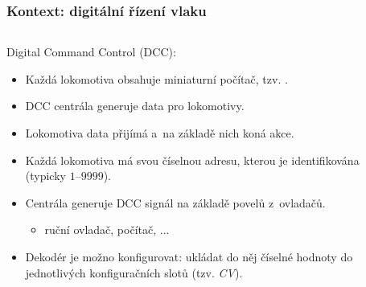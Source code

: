 \documentclass[aspectratio=169]{beamer}
\begin{document}

\begin{frame}
\frametitle{Kontext: digitální řízení vlaku}
\begin{columns}
	\begin{column}{.8\textwidth}
		Digital Command Control (DCC):
		\begin{itemize}
		\item Každá lokomotiva obsahuje miniaturní počítač, tzv. .
		\item DCC centrála generuje data pro lokomotivy.
		\item Lokomotiva data přijímá a na základě nich koná akce.
		\item Každá lokomotiva má svou číselnou adresu, kterou je identifikována (typicky
		$1$--$9999$).
		\item Centrála generuje DCC signál na základě povelů z~ovladačů.
		\begin{itemize}
		\item ruční ovladač, počítač, ...
		\end{itemize}
		\item Dekodér je možno konfigurovat: ukládat do něj číselné hodnoty do jednotlivých
		konfiguračních slotů (tzv. \textit{CV}).
		\end{itemize}
	\end{column}
	\begin{column}{.2\textwidth}

\end{column}
\end{columns}
\end{frame}
\end{document}
